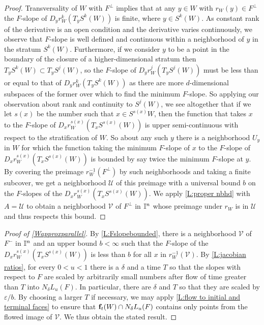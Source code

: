 \begin{proof}
	Transversality of $W$ with $F^\perp$ implies that at any $y \in W$ with $r_W(y) \in F^\perp$ the $F$-slope of $D_yr^k_W(T_yS^k(W))$ is finite, where $y \in S^k(W)$.
	As constant rank of the derivative is an open condition and the derivative varies continuously, we observe that $F$-slope is well defined and continuous within a neighborhood of $y$ in the stratum $S^k(W)$.
	Furthermore, if we consider $y$ to be a point in the boundary of the closure of a higher-dimensional stratum then $T_yS^k(W) \subset T_yS^j(W)$, so the $F$-slope of $D_yr^j_W(T_yS^j(W))$ must be less than or equal to that of $D_yr^k_W(T_yS^k(W))$ as there are more $d$-dimensional subspaces of the former over which to find the minimum $F$-slope.
	So applying our observation about rank and continuity to $S^j(W)$, we see altogether that if we let $s(x)$ be the number such that $x \in S^{s(x)}W$, then the function that takes $x$ to the $F$-slope of $D_xr^{s(x)}_W(T_xS^{s(x)}(W))$ is upper semi-continuous with respect to the stratification of $W$.
	So about any such $y$ there is a neighborhood $U_y$ in $W$ for which the function taking
	the minimum $F$-slope of $x$ to the $F$-slope of $D_xr^{s(x)}_W(T_xS^{s(x)}(W))$ is bounded by say twice the minimum $F$-slope at $y$.
	By covering the preimage $r_W^{-1}(F^\perp)$ by such neighborhoods and taking a finite subcover, we get a neighborhood ${\mathcal U}$ of this preimage with a universal bound $b$ on the $F$-slopes of the $D_xr^{s(x)}_W(T_xS^{s(x)}(W))$.
	We apply \cref{L:proper nbhd} with $A = {\mathcal U}$ to obtain a neighborhood $\mathcal{V}$ of $F^\perp$ in $\mathbb{I}^n$ whose preimage under $r_W$ is in ${\mathcal U}$ and thus respects this bound.
\end{proof}


\begin{proof}[Proof of \cref{Wapproxparallel}]
By \cref{L:Fslopebounded}, there is a neighborhood $\mathcal{V}$ of $F^-$ in $\mathbb{I}^n$ and an upper bound $b < \infty$ such that the $F$-slope of the $D_xr^{s(x)}_W(T_xS^{s(x)}(W))$ is less than $b$ for all $x$ in $r_W^{-1}(\mathcal{V})$.
By  \cref{L:jacobian ratios}, for every $0 < u < 1$ there is a $\delta$ and a time $T$ so that the slopes with respect to $F$ are scaled by arbitrarily small numbers after flow of time greater than $T$ into $N_\delta L_u(F)$.
In particular, there are $\delta$ and  $T$ so that they are scaled by $\varepsilon/ b$.
By choosing a larger $T$ if necessary, we may apply \cref{L:flow to initial and terminal faces} to ensure that $\mathbf{f}_t(W) \cap N_\delta L_u(F)$ contains only points from the flowed image of ${\mathcal{V}}$.
We thus obtain the stated result.
\end{proof}


